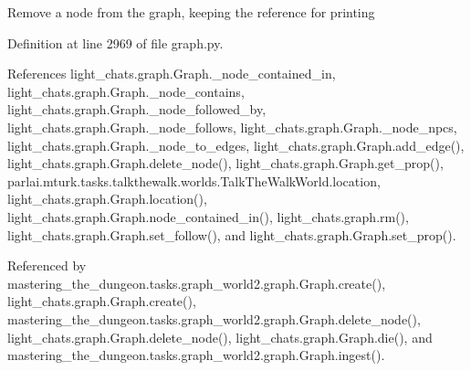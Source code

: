 \begin{DoxyVerb}Remove a node from the graph, keeping the reference for printing\end{DoxyVerb}
 

Definition at line 2969 of file graph.\+py.



References light\+\_\+chats.\+graph.\+Graph.\+\_\+node\+\_\+contained\+\_\+in, light\+\_\+chats.\+graph.\+Graph.\+\_\+node\+\_\+contains, light\+\_\+chats.\+graph.\+Graph.\+\_\+node\+\_\+followed\+\_\+by, light\+\_\+chats.\+graph.\+Graph.\+\_\+node\+\_\+follows, light\+\_\+chats.\+graph.\+Graph.\+\_\+node\+\_\+npcs, light\+\_\+chats.\+graph.\+Graph.\+\_\+node\+\_\+to\+\_\+edges, light\+\_\+chats.\+graph.\+Graph.\+add\+\_\+edge(), light\+\_\+chats.\+graph.\+Graph.\+delete\+\_\+node(), light\+\_\+chats.\+graph.\+Graph.\+get\+\_\+prop(), parlai.\+mturk.\+tasks.\+talkthewalk.\+worlds.\+Talk\+The\+Walk\+World.\+location, light\+\_\+chats.\+graph.\+Graph.\+location(), light\+\_\+chats.\+graph.\+Graph.\+node\+\_\+contained\+\_\+in(), light\+\_\+chats.\+graph.\+rm(), light\+\_\+chats.\+graph.\+Graph.\+set\+\_\+follow(), and light\+\_\+chats.\+graph.\+Graph.\+set\+\_\+prop().



Referenced by mastering\+\_\+the\+\_\+dungeon.\+tasks.\+graph\+\_\+world2.\+graph.\+Graph.\+create(), light\+\_\+chats.\+graph.\+Graph.\+create(), mastering\+\_\+the\+\_\+dungeon.\+tasks.\+graph\+\_\+world2.\+graph.\+Graph.\+delete\+\_\+node(), light\+\_\+chats.\+graph.\+Graph.\+delete\+\_\+node(), light\+\_\+chats.\+graph.\+Graph.\+die(), and mastering\+\_\+the\+\_\+dungeon.\+tasks.\+graph\+\_\+world2.\+graph.\+Graph.\+ingest().

